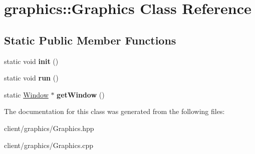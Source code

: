 \hypertarget{classgraphics_1_1_graphics}{\section{graphics\-:\-:Graphics Class Reference}
\label{classgraphics_1_1_graphics}
}
\subsection*{Static Public Member Functions}
\begin{DoxyCompactItemize}
\item 
\hypertarget{classgraphics_1_1_graphics_a0670162a879bc94934355434caf0a5d6}{static void {\bfseries init} ()}\label{classgraphics_1_1_graphics_a0670162a879bc94934355434caf0a5d6}

\item 
\hypertarget{classgraphics_1_1_graphics_acdddcb9e2ee246da057ef710fc488f7f}{static void {\bfseries run} ()}\label{classgraphics_1_1_graphics_acdddcb9e2ee246da057ef710fc488f7f}

\item 
\hypertarget{classgraphics_1_1_graphics_ab762e4e1410102b77b084b5d51f38cfe}{static \hyperlink{classgraphics_1_1_window}{Window} $\ast$ {\bfseries get\-Window} ()}\label{classgraphics_1_1_graphics_ab762e4e1410102b77b084b5d51f38cfe}

\end{DoxyCompactItemize}


The documentation for this class was generated from the following files\-:\begin{DoxyCompactItemize}
\item 
client/graphics/Graphics.\-hpp\item 
client/graphics/Graphics.\-cpp\end{DoxyCompactItemize}
